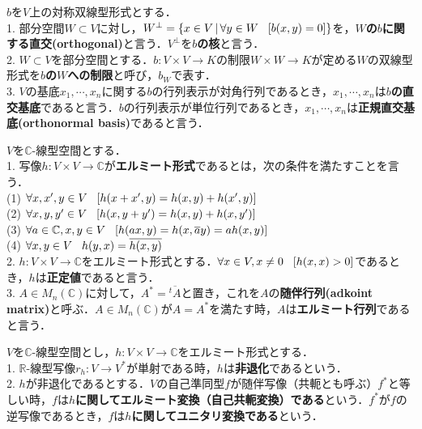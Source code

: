 \documentclass[uplatex, 12pt, dvipdfmx]{jsreport}
\begin{document}
\begin{definition}$b$を$V$上の対称双線型形式とする．\rm{}\\
    1. 部分空間$W\subset V$に対し，$W^\perp = \{ x\in V\,|\, \forall y\in W \hspace{3mm}[b(x,y)=0] \}$を，\textbf{$W$の$b$に関する直交(orthogonal)}と言う．$V^\perp$を\textbf{$b$の核}と言う．\\
    2. $W\subset V$を部分空間とする．$b:V\times V\longrightarrow K$の制限$W\times W\longrightarrow K$が定める$W$の双線型形式を\textbf{$b$の$W$への制限}と呼び，$b_W$で表す．\\
    3. $V$の基底$x_1,\cdots,x_n$に関する$b$の行列表示が対角行列であるとき，$x_1,\cdots,x_n$は\textbf{$b$の直交基底}であると言う．$b$の行列表示が単位行列であるとき，$x_1,\cdots,x_n$は\textbf{正規直交基底(orthonormal basis)}であると言う．
\end{definition}

\begin{definition}$V$を$\mathbb{C}$-線型空間とする．\rm{}\\
    1. 写像$h:V\times V\longrightarrow\mathbb{C}$が\textbf{エルミート形式}であるとは，次の条件を満たすことを言う．\\
    \hspace{3mm}(1) $\forall x,x',y\in V \hspace{3mm} [h(x+x',y)=h(x,y)+h(x',y)]$\\
    \hspace{3mm}(2) $\forall x,y,y'\in V \hspace{3mm} [h(x,y+y')=h(x,y)+h(x,y')]$\\
    \hspace{3mm}(3) $\forall a\in\mathbb{C}, x,y\in V \hspace{3mm} [h(ax,y)=h(x,\overline{a}y)=ah(x,y)]$\\
    \hspace{3mm}(4) $\forall x,y\in V \hspace{3mm} h(y,x)=\overline{h(x,y)}$\\
    2. $h:V\times V\longrightarrow\mathbb{C}$をエルミート形式とする．$\forall x\in V, x\ne 0 \hspace{3mm}[h(x,x)>0]$であるとき，$h$は\textbf{正定値}であると言う．\\
    3. $A\in M_n(\mathbb{C})$に対して，$A^*=\overline{{}^t\!A}$と置き，これを$A$の\textbf{随伴行列(adkoint matrix)}と呼ぶ．$A\in M_n(\mathbb{C})$が$A=A^*$を満たす時，$A$は\textbf{エルミート行列}であると言う．
\end{definition}
\begin{definition}$V$を$\mathbb{C}$-線型空間とし，$h:V\times V\longrightarrow\mathbb{C}$をエルミート形式とする．\rm{}\\
    1. $\mathbb{R}$-線型写像$r_h:V\longrightarrow V^*$が単射である時，$h$は\textbf{非退化}であるという．\\
    2. $h$が非退化であるとする．$V$の自己準同型$f$が随伴写像（共軛とも呼ぶ）$f^*$と等しい時，$f$は\textbf{$h$に関してエルミート変換（自己共軛変換）である}という．$f^*$が$f$の逆写像であるとき，$f$は\textbf{$h$に関してユニタリ変換である}という．
\end{definition}
\end{document}
